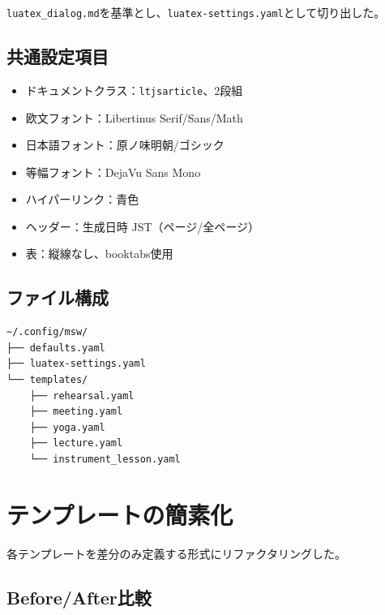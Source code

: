 \documentclass[a4paper,10pt,twocolumn]{ltjsarticle}
\begin{document}
\texttt{luatex\_dialog.md}を基準とし、\texttt{luatex-settings.yaml}として切り出した。

\subsection{共通設定項目}

\begin{itemize}[noitemsep]
    \item ドキュメントクラス：\texttt{ltjsarticle}、2段組
    \item 欧文フォント：Libertinus Serif/Sans/Math
    \item 日本語フォント：原ノ味明朝/ゴシック
    \item 等幅フォント：DejaVu Sans Mono
    \item ハイパーリンク：青色
    \item ヘッダー：生成日時 JST（ページ/全ページ）
    \item 表：縦線なし、booktabs使用
\end{itemize}

\subsection{ファイル構成}

\begin{verbatim}
~/.config/msw/
├── defaults.yaml
├── luatex-settings.yaml
└── templates/
    ├── rehearsal.yaml
    ├── meeting.yaml
    ├── yoga.yaml
    ├── lecture.yaml
    └── instrument_lesson.yaml
\end{verbatim}

\section{テンプレートの簡素化}

各テンプレートを差分のみ定義する形式にリファクタリングした。

\subsection{Before/After比較}

\vspace{0.5\baselineskip}
\vspace{0.5\baselineskip}
\end{document}

